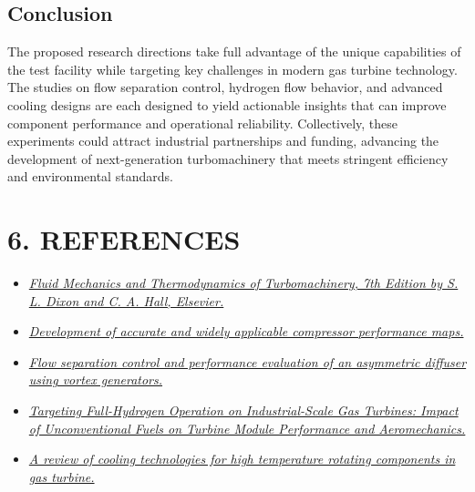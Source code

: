 \documentclass[12pt]{article}
\begin{document}
\subsection*{Conclusion}
The proposed research directions take full advantage of the unique capabilities of the test facility while targeting key challenges in modern gas turbine technology. The studies on flow separation control, hydrogen flow behavior, and advanced cooling designs are each designed to yield actionable insights that can improve component performance and operational reliability. Collectively, these experiments could attract industrial partnerships and funding, advancing the development of next-generation turbomachinery that meets stringent efficiency and environmental standards.

\section*{\large{6. REFERENCES}}
\begin{itemize}
\item \href{https://dl.icdst.org/pdfs/files3/78256836a74743b12293cba5e27e4dc3.pdf}{\textit{Fluid Mechanics and Thermodynamics of Turbomachinery, 7th Edition by S. L. Dixon and C. A. Hall, Elsevier.}} 
\item \href{https://iopscience.iop.org/article/10.1088/1757-899X/1180/1/012041/pdf}{\textit{Development of accurate and widely applicable
compressor performance maps.}}
\item \href{https://www.sciencedirect.com/science/article/pii/S1270963823001347}{\textit{Flow separation control and performance evaluation of an asymmetric diffuser using vortex generators.}}
\item \href{https://asmedigitalcollection.asme.org/turbomachinery/article/147/7/071008/1208628/Targeting-Full-Hydrogen-Operation-on-Industrial}{\textit{Targeting Full-Hydrogen
Operation on Industrial-Scale Gas Turbines: Impact of Unconventional Fuels on
Turbine Module Performance and Aeromechanics.}}

\item \href{https://www.sciencedirect.com/science/article/pii/S2212540X2200044X}{\textit{ A review of cooling technologies for high temperature rotating components in gas turbine.}}

\end{itemize}
\end{document}
